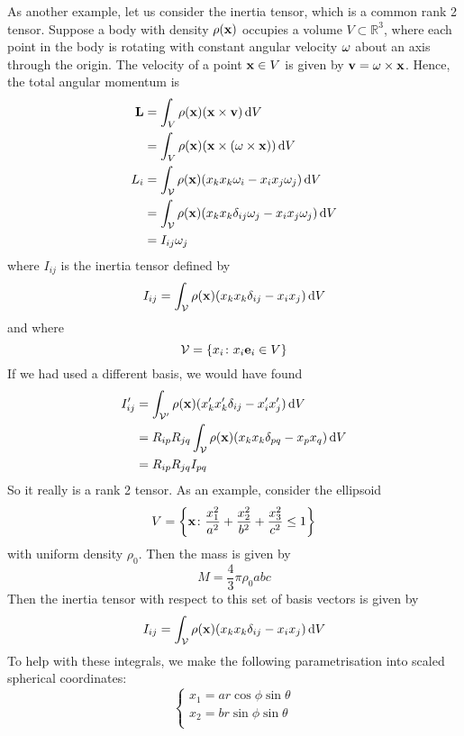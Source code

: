 \begin{example}
	As another example, let us consider the inertia tensor, which is a common rank 2 tensor.
	Suppose a body with density \(\rho(\vb x)\) occupies a volume \(V \subset \mathbb R^3\), where each point in the body is rotating with constant angular velocity \(\vb\omega\) about an axis through the origin.
	The velocity of a point \(\vb x \in V\) is given by \(\vb v = \vb \omega \times \vb x\).
	Hence, the total angular momentum is
	\begin{align*}
		\vb L & = \int_V \rho(\vb x) (\vb x \times \vb v) \dd{V}                                         \\
			  & = \int_V \rho(\vb x) (\vb x \times (\vb \omega \times \vb x)) \dd{V}                     \\
		L_i   & = \int_{\mathcal V} \rho(\vb x) (x_k x_k \omega_i - x_i x_j \omega_j) \dd{V}             \\
			  & = \int_{\mathcal V} \rho(\vb x) (x_k x_k \delta_{ij} \omega_j - x_i x_j \omega_j) \dd{V} \\
			  & = I_{ij}\omega_j
	\end{align*}
	where \(I_{ij}\) is the inertia tensor defined by
	\[
		I_{ij} = \int_{\mathcal V} \rho(\vb x) (x_k x_k \delta_{ij} - x_i x_j) \dd{V}
	\]
	and where
	\[
		\mathcal V = \qty{ x_i \colon x_i \vb e_i \in V }
	\]
	If we had used a different basis, we would have found
	\begin{align*}
		I_{ij}' & = \int_{\mathcal V'} \rho(\vb x) (x_k' x_k' \delta_{ij} - x_i' x_j') \dd{V}          \\
				& = R_{ip} R_{jq} \int_{\mathcal V} \rho(\vb x) (x_k x_k \delta_{pq} - x_p x_q) \dd{V} \\
				& = R_{ip} R_{jq} I_{pq}
	\end{align*}
	So it really is a rank 2 tensor.
	As an example, consider the ellipsoid
	\[
		V = \qty{ \vb x \colon \frac{x_1^2}{a^2} + \frac{x_2^2}{b^2} + \frac{x_3^2}{c^2} \leq 1 }
	\]
	with uniform density \(\rho_0\).
	Then the mass is given by
	\[
		M = \frac{4}{3}\pi \rho_0 abc
	\]
	Then the inertia tensor with respect to this set of basis vectors is given by
	\[
		I_{ij} = \int_{\mathcal V} \rho(\vb x) (x_k x_k \delta_{ij} - x_i x_j) \dd{V}
	\]
	To help with these integrals, we make the following parametrisation into scaled spherical coordinates:
	\[
		\left\{ \begin{array}{l}
			x_1 = ar\cos\phi\sin\theta \\
			x_2 = br\sin\phi\sin\theta \\

\end{array}\]
\end{example}
